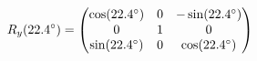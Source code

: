 \documentclass[preview]{standalone}
\begin{document}
\begin{align*}
\special{dvisvgm:raw <g id='unique000'>}R_y(22.4^\circ) = \begin{pmatrix} \cos(22.4^\circ) & 0 & -\sin(22.4^\circ) \\ 0 & 1 & 0 \\ \sin(22.4^\circ) & 0 & \cos(22.4^\circ) \end{pmatrix}\special{dvisvgm:raw </g>}
\end{align*}
\end{document}
